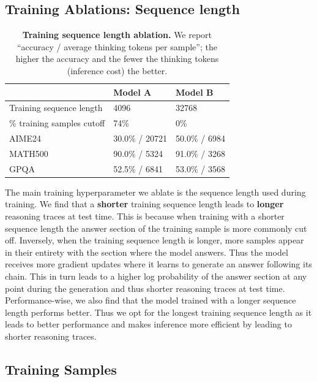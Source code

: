 \documentclass{article}
\theoremstyle{plain}
\theoremstyle{definition}
\theoremstyle{remark}
\begin{document}
\subsection{Training Ablations: Sequence length}
\label{sec:trainabl}

\begin{table}[htbp]
\centering
\caption{\textbf{Training sequence length ablation.} We report ``accuracy / average thinking tokens per sample''; the higher the accuracy and the fewer the thinking tokens (inference cost) the better.}
\begin{tabular}{p{4cm} p{3.7cm} p{3.7cm}}
\toprule
& Model A & Model B \\
\midrule
Training sequence length & 4096 & 32768 \\
\% training samples cutoff & 74\% & 0\% \\
\midrule
AIME24 & 30.0\% / 20721 & 50.0\% / 6984 \\
MATH500 & 90.0\% / 5324 & 91.0\% / 3268 \\
GPQA & 52.5\% / 6841 & 53.0\% / 3568 \\
\bottomrule
\end{tabular}
\label{tab:seqabl}
\end{table}

The main training hyperparameter we ablate is the sequence length used during training. We find that a \textbf{shorter} training sequence length leads to \textbf{longer} reasoning traces at test time. This is because when training with a shorter sequence length the answer section of the training sample is more commonly cut off. Inversely, when the training sequence length is longer, more samples appear in their entirety with the section where the model answers. Thus the model receives more gradient updates where it learns to generate an answer following its chain. This in turn leads to a higher log probability of the answer section at any point during the generation and thus shorter reasoning traces at test time. Performance-wise, we also find that the model trained with a longer sequence length performs better. Thus we opt for the longest training sequence length as it leads to better performance and makes inference more efficient by leading to shorter reasoning traces.

\FloatBarrier

\subsection{Training Samples}
\label{sec:samples}
\end{document}
